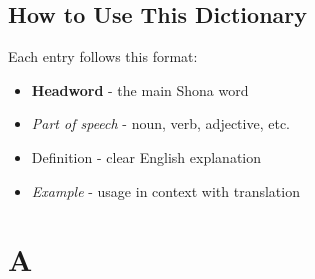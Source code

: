 \documentclass[10pt,twoside]{book}
\begin{document}
\section*{How to Use This Dictionary}

Each entry follows this format:
\begin{itemize}
\item \textbf{Headword} - the main Shona word
\item \textit{Part of speech} - noun, verb, adjective, etc.
\item Definition - clear English explanation
\item \textit{Example} - usage in context with translation
\end{itemize}

\mainmatter

\chapter*{A}
\label{chap:A}
\end{document}
